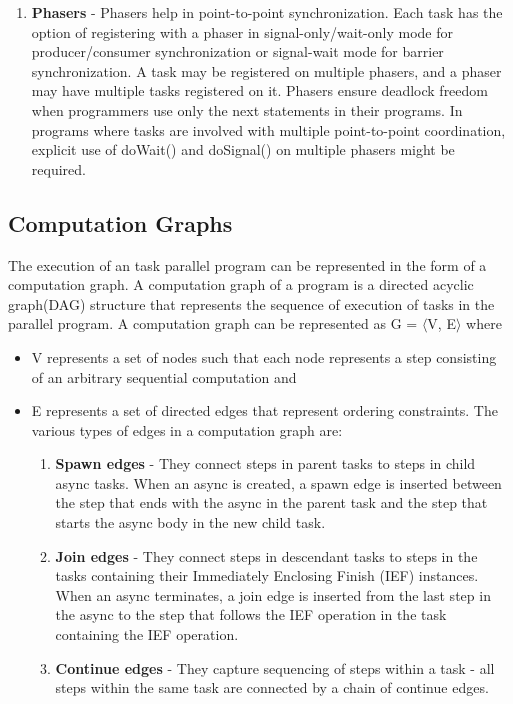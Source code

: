 \begin{enumerate}
\begin{enumerate}
\item \textbf{Phasers} - Phasers help in point-to-point synchronization. Each task has the option of registering with a phaser in signal-only/wait-only mode for producer/consumer synchronization or signal-wait mode for barrier synchronization. A task may be registered on multiple phasers, and a phaser may have multiple tasks registered on it. Phasers ensure deadlock freedom when programmers use only the next statements in their programs. In programs where tasks are involved with multiple point-to-point coordination, explicit use of doWait() and doSignal() on multiple phasers might be required.  
\end{enumerate}
\end{enumerate}

\subsection{Computation Graphs}
The execution of an task parallel program can be represented in the form of a computation graph. A computation graph of a program is a directed acyclic graph(DAG) structure that represents the sequence of execution of tasks in the parallel program. A computation graph can be represented as G = $\langle$V, E$\rangle$ where
\begin{itemize}
\item V represents a set of nodes such that  each node represents a step consisting of an arbitrary sequential computation and
\item E represents a set of directed edges that represent ordering constraints. The various types of edges in a computation graph are:
\begin{enumerate}
 \item \textbf{Spawn edges} - They connect steps in parent tasks to steps in child async tasks. When an async is created, a spawn edge is inserted between the step that ends with the async in the parent task and the step that starts the async body in the new child task.
\item \textbf{Join edges} - They connect steps in descendant tasks to steps in the tasks containing their Immediately Enclosing Finish (IEF) instances. When an async terminates, a join edge is inserted from the last step in the async to the step that follows the IEF operation in the task containing the IEF operation.
\item \textbf{Continue edges} - They capture sequencing of steps within a task - all steps within the same task are connected by a chain of continue edges.
 \end{enumerate} 
\end{itemize}


